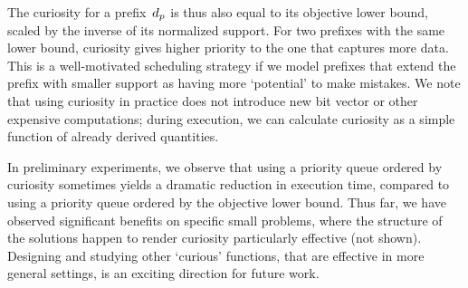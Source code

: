The curiosity for a prefix~$d_p$ is thus also equal to its objective lower bound,
scaled by the inverse of its normalized support.
%
For two prefixes with the same lower bound, curiosity gives higher priority to
the one that captures more data.
%
This is a well-motivated scheduling strategy if we model prefixes that extend
the prefix with smaller support as having more `potential' to make mistakes.
%
We note that using curiosity in practice does not introduce new bit vector
or other expensive computations; during execution, we can calculate curiosity
as a simple function of already derived quantities.

In preliminary experiments, we observe that using a priority queue ordered by
curiosity sometimes yields a dramatic reduction in execution time,
compared to using a priority queue ordered by the objective lower bound.
%
Thus far, we have observed significant benefits on specific small problems,
where the structure of the solutions happen to render curiosity particularly
effective (not shown).
%
Designing and studying other `curious' functions, that are effective in more
general settings, is an exciting direction for future work.
